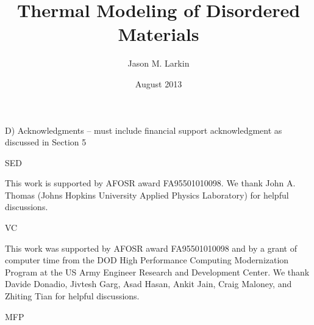 \documentclass[12pt]{cmuthesis}
\begin{document}
 
\frontmatter

\clearpage

\pagestyle{empty}


\title{ %
{\bf Thermal Modeling of Disordered Materials}}
\author{Jason M. Larkin}
\date{August 2013}
\trnumber{}



\disclaimer{}




\maketitle


\pagestyle{plain} %


\begin{acknowledgments}
D) Acknowledgments – must include financial support acknowledgment as 
discussed in Section 5

SED

This work is supported by AFOSR award FA95501010098. We thank John A. 
Thomas (Johns Hopkins 
University Applied Physics Laboratory) for helpful discussions.

VC

This work was supported by AFOSR award FA95501010098 and by a grant 
of computer time from the DOD 
High Performance Computing Modernization Program at the US Army Engineer 
Research and Development Center. 
We thank Davide Donadio, Jivtesh Garg, Asad Hasan, Ankit Jain, Craig Maloney, 
and Zhiting Tian for helpful discussions.

MFP



\end{acknowledgments}
\end{document}
